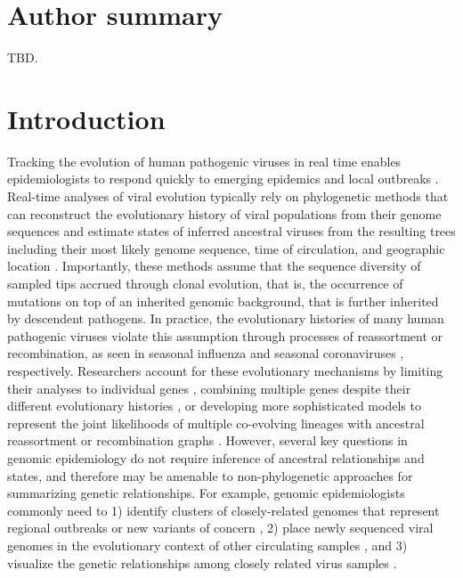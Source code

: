 \documentclass[10pt,letterpaper]{article}
\begin{document}
\section*{Author summary}
TBD.

\linenumbers

\section*{Introduction}

Tracking the evolution of human pathogenic viruses in real time enables epidemiologists to respond quickly to emerging epidemics and local outbreaks \cite{Grubaugh2019}.
Real-time analyses of viral evolution typically rely on phylogenetic methods that can reconstruct the evolutionary history of viral populations from their genome sequences and estimate states of inferred ancestral viruses from the resulting trees including their most likely genome sequence, time of circulation, and geographic location \cite{Volz2013,Baele2017,Sagulenko2018}.
Importantly, these methods assume that the sequence diversity of sampled tips accrued through clonal evolution, that is, the occurrence of mutations on top of an inherited genomic background, that is further inherited by descendent pathogens.
In practice, the evolutionary histories of many human pathogenic viruses violate this assumption through processes of reassortment or recombination, as seen in seasonal influenza \cite{Nelson2008,Marshall2013} and seasonal coronaviruses \cite{Su2016}, respectively.
Researchers account for these evolutionary mechanisms by limiting their analyses to individual genes \cite{Lemey2007,Bhatt2011}, combining multiple genes despite their different evolutionary histories \cite{Wiens1998}, or developing more sophisticated models to represent the joint likelihoods of multiple co-evolving lineages with ancestral reassortment or recombination graphs \cite{Barrat-Charlaix2022,Muller2022}.
However, several key questions in genomic epidemiology do not require inference of ancestral relationships and states, and therefore may be amenable to non-phylogenetic approaches for summarizing genetic relationships.
For example, genomic epidemiologists commonly need to 1) identify clusters of closely-related genomes that represent regional outbreaks or new variants of concern \cite{OToole2022,McBroome2022,Stoddard2022,Tran-Kiem2023}, 2) place newly sequenced viral genomes in the evolutionary context of other circulating samples \cite{OToole2021,Turakhia2021,Aksamentov2021}, and 3) visualize the genetic relationships among closely related virus samples \cite{Argimon2016,Campbell2021}.
\end{document}
